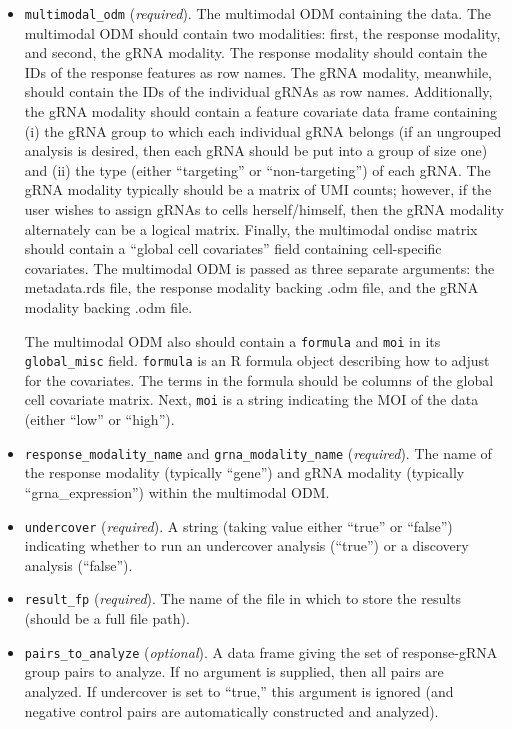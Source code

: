 \documentclass[12pt]{article}
\begin{document}
\begin{itemize}

\item \texttt{multimodal\_odm} (\textit{required}). The multimodal ODM containing the data. The multimodal ODM should contain two modalities: first, the response modality, and second, the gRNA modality. The response modality should contain the IDs of the response features as row names. The gRNA modality, meanwhile, should contain the IDs of the individual gRNAs as row names. Additionally, the gRNA modality should contain a feature covariate data frame containing (i) the gRNA group to which each individual gRNA belongs (if an ungrouped analysis is desired, then each gRNA should be put into a group of size one) and (ii) the type (either “targeting” or “non-targeting”) of each gRNA. The gRNA modality typically should be a matrix of UMI counts; however, if the user wishes to assign gRNAs to cells herself/himself, then the gRNA modality alternately can be a logical matrix. Finally, the multimodal ondisc matrix should contain a “global cell covariates” field containing cell-specific covariates. The multimodal ODM is passed as three separate arguments: the metadata.rds file, the response modality backing .odm file, and the gRNA modality backing .odm file.

The multimodal ODM also should contain a \texttt{formula} and \texttt{moi} in its \texttt{global\_misc} field. \texttt{formula} is an R formula object describing how to adjust for the covariates. The terms in the formula should be columns of the global cell covariate matrix. Next, \texttt{moi} is a string indicating the MOI of the data (either ``low'' or ``high'').

\item \texttt{response\_modality\_name} and \texttt{grna\_modality\_name} (\textit{required}). The name of the response modality (typically ``gene'') and gRNA modality (typically ``grna\_expression'') within the multimodal ODM. 

\item \texttt{undercover} (\textit{required}). A string (taking value either “true” or “false”) indicating whether to run an undercover analysis (“true”) or a discovery analysis (“false”).

\item \texttt{result\_fp} (\textit{required}). The name of the file in which to store the results (should be a full file path).

\item \texttt{pairs\_to\_analyze} (\textit{optional}). A data frame giving the set of response-gRNA group pairs to analyze. If no argument is supplied, then all pairs are analyzed. If undercover is set to “true,” this argument is ignored (and negative control pairs are automatically constructed and analyzed).


\end{itemize}
\end{document}
